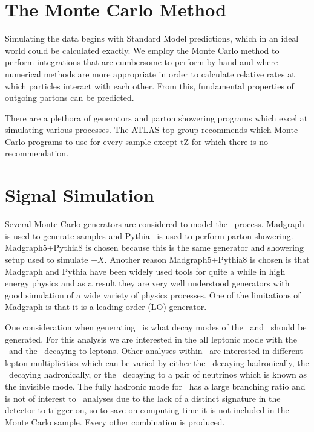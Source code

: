 
\section{The Monte Carlo Method}
\label{SECTION-MC-METHOD}

Simulating the data begins with Standard Model predictions, which in an ideal world could be calculated exactly. We employ the Monte Carlo method to perform integrations that are cumbersome to perform by hand and where numerical methods are more appropriate in order to calculate relative rates at which particles interact with each other. From this, fundamental properties of outgoing partons can be predicted.

There are a plethora of generators and parton showering programs which excel at simulating various processes. The ATLAS top group recommends which Monte Carlo programs to use for every sample except tZ for which there is no recommendation.

\section{Signal Simulation}
\label{SECTION-MC-SIG}

Several Monte Carlo generators are considered to model the \tz~process. Madgraph~\cite{MADGRAPH} is used to generate samples and Pythia~\cite{PYTHIA} is used to perform parton showering. Madgraph5+Pythia8 is chosen because this is the same generator and showering setup used to simulate \TTB$+X$. Another reason Madgraph5+Pythia8 is chosen is that Madgraph and Pythia have been widely used tools for quite a while in high energy physics and as a result they are very well understood generators with good simulation of a wide variety of physics processes. One of the limitations of Madgraph is that it is a leading order (LO) generator. 

One consideration when generating \tz~is what decay modes of the \az~and \aw~should be generated. For this analysis we are interested in the all leptonic mode with the \az~and the \aw~decaying to leptons. Other analyses within \atlas~are interested in different lepton multiplicities which can be varied by either the \aw~decaying hadronically, the \az~decaying hadronically, or the \az~decaying to a pair of neutrinos which is known as the invisible mode. The fully hadronic mode for \tz~has a large branching ratio and is not of interest to \atlas~analyses due to the lack of a distinct signature in the detector to trigger on, so to save on computing time it is not included in the Monte Carlo sample. Every other combination is produced. 

